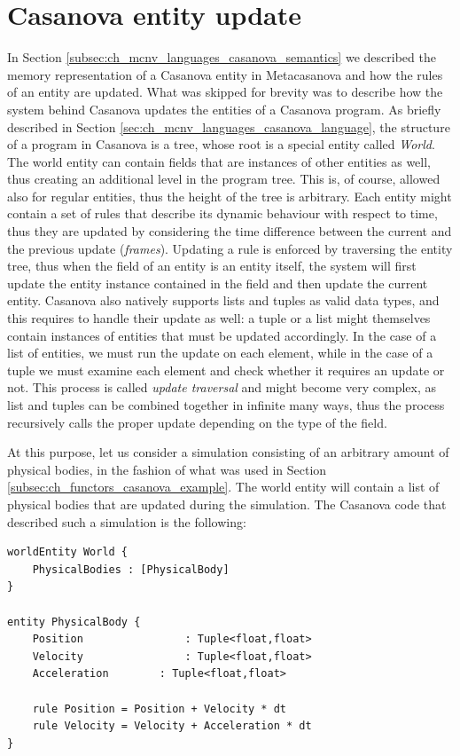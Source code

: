 \section{Casanova entity update}
\label{subsec:ch_networking_casanova_update}
In Section \ref{subsec:ch_mcnv_languages_casanova_semantics} we described the memory representation of a Casanova entity in Metacasanova and how the rules of an entity are updated. What was skipped for brevity was to describe how the system behind Casanova updates the entities of a Casanova program. As briefly described in Section \ref{sec:ch_mcnv_languages_casanova_language}, the structure of a program in Casanova is a tree, whose root is a special entity called \textit{World}. The world entity can contain fields that are instances of other entities as well, thus creating an additional level in the program tree. This is, of course, allowed also for regular entities, thus the height of the tree is arbitrary. Each entity might contain a set of rules that describe its dynamic behaviour with respect to time, thus they are updated by considering the time difference between the current and the previous update (\textit{frames}). Updating a rule is enforced by traversing the entity tree, thus when the field of an entity is an entity itself, the system will first update the entity instance contained in the field and then update the current entity. Casanova also natively supports lists and tuples as valid data types, and this requires to handle their update as well: a tuple or a list might themselves contain instances of entities that must be updated accordingly. In the case of a list of entities, we must run the update on each element, while in the case of a tuple we must examine each element and check whether it requires an update or not. This process is called \textit{update traversal} and might become very complex, as list and tuples can be combined together in infinite many ways, thus the process recursively calls the proper update depending on the type of the field.

At this purpose, let us consider a simulation consisting of an arbitrary amount of physical bodies, in the fashion of what was used in Section \ref{subsec:ch_functors_casanova_example}. The world entity will contain a list of physical bodies that are updated during the simulation. The Casanova code that described such a simulation is the following:

\begin{lstlisting}
worldEntity World {
	PhysicalBodies : [PhysicalBody]
}

entity PhysicalBody {
	Position				: Tuple<float,float>
	Velocity				: Tuple<float,float>
	Acceleration		: Tuple<float,float>
	
	rule Position = Position + Velocity * dt
	rule Velocity = Velocity + Acceleration * dt
}
\end{lstlisting}

